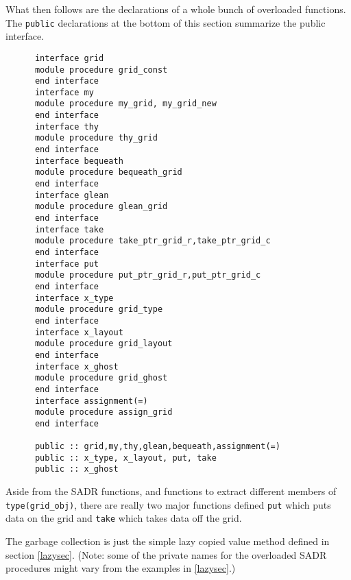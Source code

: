 What then follows are the declarations of a whole bunch of 
overloaded functions.  The \verb+public+ declarations at the bottom
of this section summarize the public interface.
\begin{verbatim}
      interface grid
      module procedure grid_const
      end interface
      interface my
      module procedure my_grid, my_grid_new
      end interface
      interface thy
      module procedure thy_grid
      end interface
      interface bequeath
      module procedure bequeath_grid
      end interface
      interface glean
      module procedure glean_grid
      end interface
      interface take
      module procedure take_ptr_grid_r,take_ptr_grid_c
      end interface
      interface put
      module procedure put_ptr_grid_r,put_ptr_grid_c
      end interface
      interface x_type
      module procedure grid_type
      end interface
      interface x_layout
      module procedure grid_layout
      end interface
      interface x_ghost
      module procedure grid_ghost
      end interface
      interface assignment(=)
      module procedure assign_grid
      end interface

      public :: grid,my,thy,glean,bequeath,assignment(=)
      public :: x_type, x_layout, put, take
      public :: x_ghost
\end{verbatim}
Aside from the SADR functions, and functions to extract different
members of \verb+type(grid_obj)+, there are really two major functions
defined \verb+put+ which puts data on the grid and \verb+take+ which
takes data off the grid.

The garbage collection is just the simple lazy copied value method defined
in section \ref{lazysec}.  (Note: some of the private names for the overloaded
SADR procedures might vary from the examples in \ref{lazysec}.)

